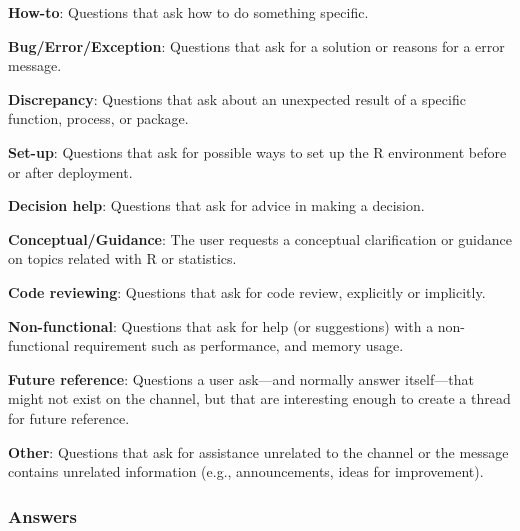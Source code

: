     \begin{packed_enum}
    \item \textbf{How-to}: Questions that ask how to do something specific.
    \item \textbf{Bug/Error/Exception}: Questions that ask for a solution or reasons for a error message.
    \item \textbf{Discrepancy}: Questions that ask about an unexpected result of a specific function, process, or package.
    \item \textbf{Set-up}: Questions that ask for possible ways to set up the R environment before or after deployment.
    \item \textbf{Decision help}: Questions that ask for advice in making a decision.
    \item \textbf{Conceptual/Guidance}: The user requests a conceptual clarification or guidance on topics related with R or statistics.
    \item \textbf{Code reviewing}: Questions that ask for code review, explicitly or implicitly.
    \item \textbf{Non-functional}: Questions that ask for help (or suggestions) with a non-functional requirement such as performance, and memory usage.
    \item \textbf{Future reference}: Questions a user ask---and normally answer itself---that might not exist on the channel, but that are interesting enough to create a thread for future reference.
    \item \textbf{Other}: Questions that ask for assistance unrelated to the channel or the message contains unrelated information (e.g., announcements, ideas for improvement).
    \end{packed_enum}

\subsubsection{Answers}

